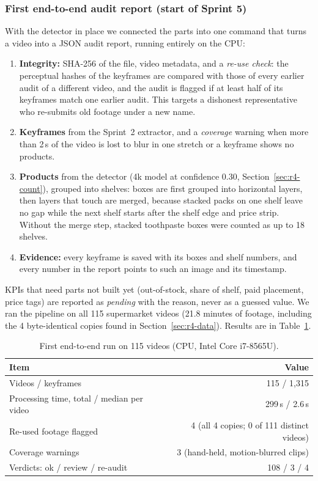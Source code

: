 \subsubsection{First end-to-end audit report (start of Sprint 5)}\label{sec:r4-audit}
With the detector in place we connected the parts into one command that turns a video into a JSON
audit report, running entirely on the CPU:
\begin{enumerate}
  \item \textbf{Integrity:} SHA-256 of the file, video metadata, and a \emph{re-use check}: the
  perceptual hashes of the keyframes are compared with those of every earlier audit of a different
  video, and the audit is flagged if at least half of its keyframes match one earlier audit. This
  targets a dishonest representative who re-submits old footage under a new name.
  \item \textbf{Keyframes} from the Sprint~2 extractor, and a \emph{coverage} warning when more than
  2\,s of the video is lost to blur in one stretch or a keyframe shows no products.
  \item \textbf{Products} from the detector (4k model at confidence 0.30,
  Section~\ref{sec:r4-count}), grouped
  into shelves: boxes are first grouped into horizontal layers, then layers that touch are merged,
  because stacked packs on one shelf leave no gap while the next shelf starts after the shelf edge
  and price strip. Without the merge step, stacked toothpaste boxes were counted as up to 18 shelves.
  \item \textbf{Evidence:} every keyframe is saved with its boxes and shelf numbers, and every number in
  the report points to such an image and its timestamp.
\end{enumerate}
KPIs that need parts not built yet (out-of-stock, share of shelf, paid placement, price tags) are
reported as \emph{pending} with the reason, never as a guessed value. We ran the pipeline on all 115
supermarket videos (21.8 minutes of footage, including the 4 byte-identical copies found in
Section~\ref{sec:r4-data}). Results are in Table~\ref{tab:r4-audit}.

\begin{table}[!t]
\centering
\caption{First end-to-end run on 115 videos (CPU, Intel Core i7-8565U).}
\label{tab:r4-audit}
\begin{tabular}{lr}
\hline
Item & Value \\
\hline
Videos / keyframes & 115 / 1{,}315 \\
Processing time, total / median per video & 299\,s / 2.6\,s \\
Re-used footage flagged & 4 (all 4 copies; 0 of 111 distinct videos) \\
Coverage warnings & 3 (hand-held, motion-blurred clips) \\
Verdicts: ok / review / re-audit & 108 / 3 / 4 \\
\hline
\end{tabular}
\end{table}

